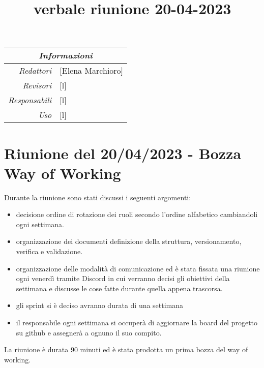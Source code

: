 \documentclass[12pt]{article}
\begin{document}
\graphicspath{ {../templates/img} }

\title{verbale riunione 20-04-2023}

\firstPage

\maketitle
\begin{center}
    \begin{tabular}{r | l}
		\multicolumn{2}{c}{\textit{Informazioni}}\\
		\hline
		
			\textit{Redattori} &
			[Elena Marchioro]\makecell{}\\
		
			\textit{Revisori} &
			[l]\makecell{}\\
			\textit{Responsabili} &
			[l]\makecell{}\\
		      \textit{Uso} & 
                [l]\makecell{}\\
\end{tabular}
\end{center}


\tableofcontents
\printindex 
\section{Riunione del 20/04/2023 - Bozza Way of Working}
Durante la riunione sono stati discussi i seguenti argomenti:
\begin{itemize}
    \item decisione ordine di rotazione dei ruoli secondo l'ordine alfabetico cambiandoli ogni settimana.
    \item organizzazione dei documenti definizione della struttura, versionamento, verifica e validazione.
    \item organizzazione delle modalità di comunicazione ed è stata fissata una riunione ogni venerdì tramite Discord in cui verranno decisi gli obiettivi della settimana e discusse le cose fatte durante quella appena trascorsa.
    \item gli sprint si è deciso avranno durata di una settimana
    \item il responsabile ogni settimana si occuperà di aggiornare la board del progetto su github e assegnerà a ognuno il suo compito.
\end{itemize}
La riunione è durata 90 minuti ed è stata prodotta un prima bozza del way of working.
\end{document}
